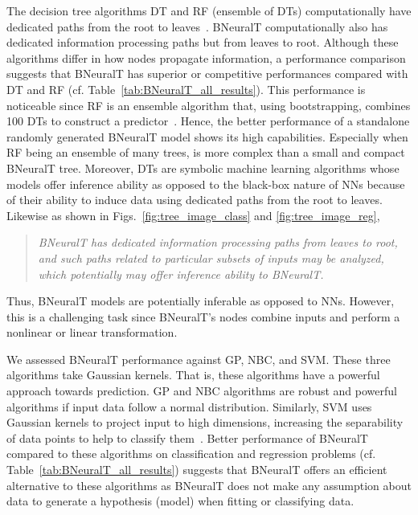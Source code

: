 \documentclass[11pt,a4paper]{article}
\begin{document}
    The decision tree algorithms DT and RF (ensemble of DTs) computationally have dedicated paths from the root to leaves~\citep{breiman1984classification,breiman2001random}. BNeuralT  computationally also has dedicated information processing paths but from leaves to root. Although these algorithms differ in how nodes propagate information, a performance comparison suggests that BNeuralT has superior or competitive performances compared with DT and RF (cf. Table~\ref{tab:BNeuralT_all_results}). This performance is noticeable since RF is an ensemble algorithm that, using bootstrapping, combines 100 DTs to construct a predictor~\citep{breiman2001random}. Hence, the better performance of a standalone randomly generated BNeuralT model shows its high capabilities. Especially when RF being an ensemble of many trees, is more complex than a small and compact BNeuralT tree. Moreover, DTs are symbolic machine learning algorithms whose models offer inference ability as opposed to the black-box nature of NNs because of their ability to induce data using dedicated paths from the root to leaves. Likewise as shown in Figs.~\ref{fig:tree_image_class} and \ref{fig:tree_image_reg}, 
    \begin{quote}
    \textit{BNeuralT has dedicated information processing paths from leaves to root, and such paths related to particular subsets of inputs may be analyzed, which potentially may offer inference ability to BNeuralT.}
      \end{quote}
    
    Thus, BNeuralT models are potentially inferable as opposed to NNs. However, this is a challenging task since BNeuralT's nodes combine inputs and perform a nonlinear or linear transformation. 
    
    We assessed BNeuralT performance against GP, NBC, and SVM. These three algorithms take Gaussian kernels. That is, these algorithms have a powerful approach towards prediction. GP and NBC algorithms are robust and powerful algorithms if input data follow a normal distribution. Similarly, SVM uses Gaussian kernels to project input to high dimensions, increasing the separability of data points to help to classify them~\citep{cortes1995support}. Better performance of BNeuralT compared to these algorithms on classification and regression problems (cf. Table~\ref{tab:BNeuralT_all_results}) suggests that BNeuralT offers an efficient alternative to these algorithms as BNeuralT does not make any assumption about data to generate a hypothesis (model)  when fitting or classifying data.  
    
\end{document}
